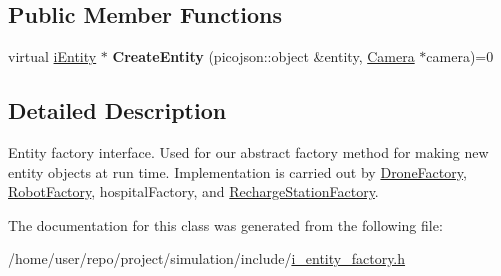 \subsection*{Public Member Functions}
\begin{DoxyCompactItemize}
\item 
\mbox{\label{classiEntityFactory_ab1ce8456ec513534a056c446d417aab7}} 
virtual \hyperlink{classiEntity}{i\+Entity} $\ast$ {\bfseries Create\+Entity} (picojson\+::object \&entity, \hyperlink{classCamera}{Camera} $\ast$camera)=0
\end{DoxyCompactItemize}


\subsection{Detailed Description}
Entity factory interface. Used for our abstract factory method for making new entity objects at run time. Implementation is carried out by \hyperlink{classDroneFactory}{Drone\+Factory}, \hyperlink{classRobotFactory}{Robot\+Factory}, hospital\+Factory, and \hyperlink{classRechargeStationFactory}{Recharge\+Station\+Factory}. 

The documentation for this class was generated from the following file\+:\begin{DoxyCompactItemize}
\item 
/home/user/repo/project/simulation/include/\hyperlink{i__entity__factory_8h}{i\+\_\+entity\+\_\+factory.\+h}\end{DoxyCompactItemize}
